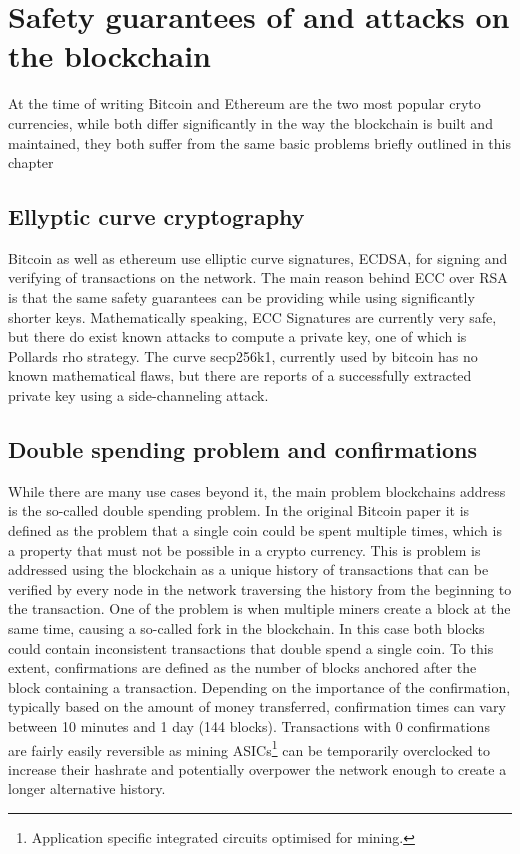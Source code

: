 \documentclass[12pt,msc,a4paper,oneside]{ucl_thesis}
\begin{document}
\chapter{Safety guarantees of and attacks on the blockchain}
\label{chapter:safety_guarantees_attacks_blockchain}
At the time of writing Bitcoin and Ethereum are the two most popular cryto currencies, while both differ significantly in the way the blockchain is built and maintained, they both suffer from the same basic problems briefly outlined in this chapter

\section{Ellyptic curve cryptography}
Bitcoin as well as ethereum use elliptic curve signatures, ECDSA, for signing and verifying of transactions on the network. The main reason behind ECC over RSA is that the same safety guarantees can be providing while using significantly shorter keys. Mathematically speaking, ECC Signatures are currently very safe, but there do exist known attacks to compute a private key, one of which is Pollards rho strategy. The curve secp256k1, currently used by bitcoin has no known mathematical flaws, but there are reports of a successfully extracted private key using a side-channeling attack. \cite{EllipticCurveOverview}

\section{Double spending problem and confirmations}
While there are many use cases beyond it, the main problem blockchains address is the so-called double spending problem. In the original Bitcoin paper it is defined as the problem that a single coin could be spent multiple times, which is a property that must not be possible in a crypto currency. This is problem is addressed using the blockchain as a unique history of transactions that can be verified by every node in the network traversing the history from the beginning to the transaction. One of the problem is when multiple miners create a block at the same time, causing a so-called fork in the blockchain. In this case both blocks could contain inconsistent transactions that double spend a single coin. To this extent, confirmations are defined as the number of blocks anchored after the block containing a transaction. Depending on the importance of the confirmation, typically based on the amount of money transferred, confirmation times can vary between 10 minutes and 1 day (144 blocks). Transactions with 0 confirmations are fairly easily reversible as mining ASICs\footnote{Application specific integrated circuits optimised for mining.} can be temporarily overclocked to increase their hashrate and potentially overpower the network enough to create a longer alternative history.
\end{document}
